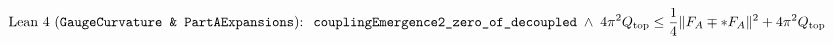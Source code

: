 \documentclass[preview]{standalone}
\begin{document}
\begin{align*}
\special{dvisvgm:raw <g id='unique000'>}\text{Lean 4 (\texttt{GaugeCurvature \& PartAExpansions}): }\; \texttt{couplingEmergence2\_zero\_of\_decoupled} \;\wedge\; 4\pi^2 Q_{\text{top}} \le \frac{1}{4}\|F_A \mp *F_A\|^2 + 4\pi^2 Q_{\text{top}}\special{dvisvgm:raw </g>}
\end{align*}
\end{document}
